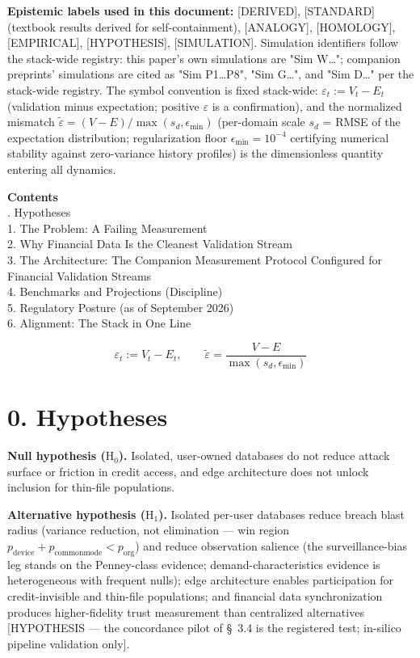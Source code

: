 \documentclass[11pt,twocolumn]{article}
\begin{document}
\textbf{Epistemic labels used in this document:} [DERIVED], [STANDARD] (textbook results derived for self-containment), [ANALOGY], [HOMOLOGY], [EMPIRICAL], [HYPOTHESIS], [SIMULATION]. Simulation identifiers follow the stack-wide registry: this paper's own simulations are "Sim W\ldots{}"; companion preprints' simulations are cited as "Sim P1\ldots{}P8", "Sim G\ldots{}", and "Sim D\ldots{}" per the stack-wide registry. The symbol convention is fixed stack-wide: \textbf{$\varepsilon_t := V_t - E_t$} (validation minus expectation; positive $\varepsilon$ is a confirmation), and the normalized mismatch $\tilde{\varepsilon} = (V - E)/\max(s_d, \epsilon_{\min})$ (per-domain scale $s_d$ = RMSE of the expectation distribution; regularization floor $\epsilon_{\min} = 10^{-4}$ certifying numerical stability against zero-variance history profiles) is the dimensionless quantity entering all dynamics.

\medskip
\noindent\textbf{Contents}\\[3pt]
{\small{}. Hypotheses\\
1. The Problem: A Failing Measurement\\
2. Why Financial Data Is the Cleanest Validation Stream\\
3. The Architecture: The Companion Measurement Protocol Configured for Financial Validation Streams\\
4. Benchmarks and Projections (Discipline)\\
5. Regulatory Posture (as of September 2026)\\
6. Alignment: The Stack in One Line\\
}
\medskip

\begin{equation}
\varepsilon_t := V_t - E_t, \qquad \tilde{\varepsilon} = \frac{V - E}{\max(s_d, \epsilon_{\min})}
\label{eq:epsilon}
\end{equation}

\section*{0. Hypotheses}

\textbf{Null hypothesis ($\mathrm{H}_0$).} Isolated, user-owned databases do not reduce attack surface or friction in credit access, and edge architecture does not unlock inclusion for thin-file populations.

\textbf{Alternative hypothesis ($\mathrm{H}_1$).} Isolated per-user databases reduce breach blast radius (variance reduction, not elimination --- win region $p_{\mathrm{device}} + p_{\mathrm{commonmode}} < p_{\mathrm{org}}$) and reduce observation salience (the surveillance-bias leg stands on the Penney-class evidence; demand-characteristics evidence is heterogeneous with frequent nulls); edge architecture enables participation for credit-invisible and thin-file populations; and financial data synchronization produces higher-fidelity trust measurement than centralized alternatives [HYPOTHESIS --- the concordance pilot of \S~3.4 is the registered test; in-silico pipeline validation only].
\end{document}
